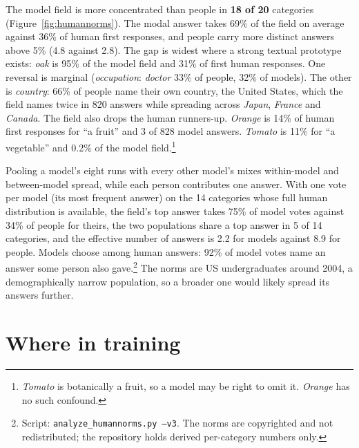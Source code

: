 \documentclass[11pt]{article}
\begin{document}
The model field is more concentrated than people in \textbf{18 of 20} categories (Figure~\ref{fig:humannorms}). The modal answer takes 69\% of the field on average against 36\% of human first responses, and people carry more distinct answers above 5\% (4.8 against 2.8). The gap is widest where a strong textual prototype exists: \emph{oak} is 95\% of the model field and 31\% of first human responses. One reversal is marginal (\emph{occupation}: \emph{doctor} 33\% of people, 32\% of models). The other is \emph{country}: 66\% of people name their own country, the United States, which the field names twice in 820 answers while spreading across \emph{Japan}, \emph{France} and \emph{Canada}. The field also drops the human runners-up. \emph{Orange} is 14\% of human first responses for ``a fruit'' and 3 of 828 model answers. \emph{Tomato} is 11\% for ``a vegetable'' and 0.2\% of the model field.\footnote{\emph{Tomato} is botanically a fruit, so a model may be right to omit it. \emph{Orange} has no such confound.}

Pooling a model's eight runs with every other model's mixes within-model and between-model spread, while each person contributes one answer. With one vote per model (its most frequent answer) on the 14 categories whose full human distribution is available, the field's top answer takes 75\% of model votes against 34\% of people for theirs, the two populations share a top answer in 5 of 14 categories, and the effective number of answers is 2.2 for models against 8.9 for people. Models choose among human answers: 92\% of model votes name an answer some person also gave.\footnote{Script: \texttt{analyze\_humannorms.py --v3}. The norms are copyrighted and not redistributed; the repository holds derived per-category numbers only.} The norms are US undergraduates around 2004, a demographically narrow population, so a broader one would likely spread its answers further.

\section{Where in training}
\label{sec:stages}
\end{document}
